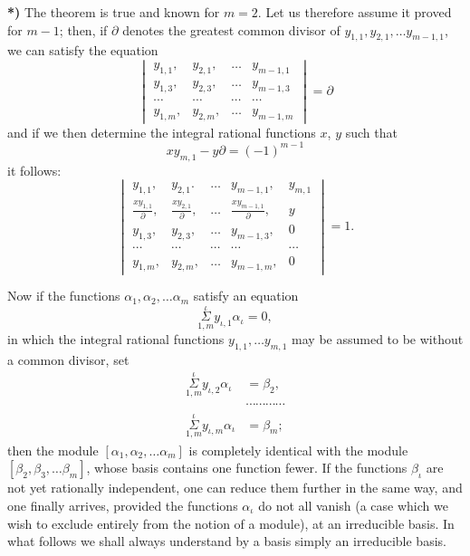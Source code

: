 \documentclass{article}
\begin{document}
\textbf{*)} The theorem is true and known for $m = 2$. Let us therefore assume it proved for $m-1$; then, if $\partial$ denotes the greatest common divisor of $y_{1,1}, y_{2,1}, \ldots y_{m-1,1}$, we can satisfy the equation
\[ \begin{vmatrix} y_{1,1}, & y_{2,1}, & \ldots & y_{m-1,1} \\ y_{1,3}, & y_{2,3}, & \ldots & y_{m-1,3} \\ \cdots & \cdots & \cdots & \cdots \\ y_{1,m}, & y_{2,m}, & \ldots & y_{m-1,m} \end{vmatrix} = \partial \]
and if we then determine the integral rational functions $x$, $y$ such that
\[ xy_{m,1} - y\partial = (-1)^{m-1} \]
it follows:
\[ \begin{vmatrix} y_{1,1}, & y_{2,1}. & \ldots & y_{m-1,1}, & y_{m,1} \\ \frac{xy_{1,1}}{\partial}, & \frac{xy_{2,1}}{\partial}, & \ldots & \frac{xy_{m-1,1}}{\partial}, & y \\ y_{1,3}, & y_{2,3}, & \ldots & y_{m-1,3}, & 0 \\ \cdots & \cdots & \cdots & \cdots & \cdots \\ y_{1,m}, & y_{2,m}, & \ldots & y_{m-1,m}, & 0 \end{vmatrix} = 1. \]


Now if the functions $\alpha_{1}, \alpha_{2}, \ldots \alpha_{m}$ satisfy an equation
\[ \overset{\iota}{\underset{1,m}{\Sigma}} y_{\iota,1}\alpha_{\iota} = 0, \]
in which the integral rational functions $y_{1,1}, \ldots y_{m,1}$ may be assumed to be without a common divisor, set
\[ \begin{aligned} \overset{\iota}{\underset{1,m}{\Sigma}} y_{\iota,2}\alpha_{\iota} &= \beta_{2}, \\ &\cdots\cdots\cdots\cdots \\ \overset{\iota}{\underset{1,m}{\Sigma}} y_{\iota,m}\alpha_{\iota} &= \beta_{m}; \end{aligned} \]
then the module $[\alpha_{1}, \alpha_{2}, \ldots \alpha_{m}]$ is completely identical with the module $[\beta_{2}, \beta_{3}, \ldots \beta_{m}]$, whose basis contains one function fewer. If the functions $\beta_{\iota}$ are not yet rationally independent, one can reduce them further in the same way, and one finally arrives, provided the functions $\alpha_{\iota}$ do not all vanish (a case which we wish to exclude entirely from the notion of a module), at an irreducible basis. In what follows we shall always understand by a basis simply an irreducible basis.
\end{document}
